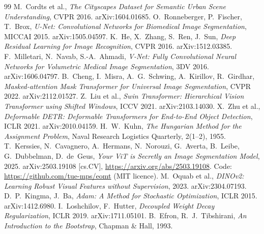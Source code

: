 \documentclass[11pt,a4paper]{article}
\newcommand{\1}{\mathbb{1}}
\begin{document}
\sloppy
\begin{thebibliography}{99}
 M.~Cordts et al., \emph{The Cityscapes Dataset for
  Semantic Urban Scene Understanding}, CVPR 2016. arXiv:1604.01685.
 O.~Ronneberger, P.~Fischer, T.~Brox,
  \emph{U-Net: Convolutional Networks for Biomedical Image Segmentation},
  MICCAI 2015. arXiv:1505.04597.
 K.~He, X.~Zhang, S.~Ren, J.~Sun, \emph{Deep Residual
  Learning for Image Recognition}, CVPR 2016. arXiv:1512.03385.
 F.~Milletari, N.~Navab, S.-A.~Ahmadi,
  \emph{V-Net: Fully Convolutional Neural Networks for Volumetric Medical
  Image Segmentation}, 3DV 2016. arXiv:1606.04797.
 B.~Cheng, I.~Misra, A.~G.~Schwing, A.~Kirillov,
  R.~Girdhar, \emph{Masked-attention Mask Transformer for Universal Image
  Segmentation}, CVPR 2022. arXiv:2112.01527.
 Z.~Liu et al., \emph{Swin Transformer: Hierarchical Vision
  Transformer using Shifted Windows}, ICCV 2021. arXiv:2103.14030.
 X.~Zhu et al., \emph{Deformable DETR: Deformable
  Transformers for End-to-End Object Detection}, ICLR 2021. arXiv:2010.04159.
 H.~W.~Kuhn, \emph{The Hungarian Method for the Assignment
  Problem}, Naval Research Logistics Quarterly, 2(1--2), 1955.
 T.~Kerssies, N.~Cavagnero,
  A.~Hermans, N.~Norouzi, G.~Averta, B.~Leibe, G.~Dubbelman, D.~de~Geus,
  \emph{Your ViT is Secretly an Image Segmentation Model}, 2025.
  arXiv:2503.19108 [cs.CV], \url{https://arxiv.org/abs/2503.19108}.
  Code: \url{https://github.com/tue-mps/eomt} (MIT licence).
 M.~Oquab et al., \emph{DINOv2: Learning Robust Visual
  Features without Supervision}, 2023. arXiv:2304.07193.
 D.~P.~Kingma, J.~Ba, \emph{Adam: A Method for
  Stochastic Optimization}, ICLR 2015. arXiv:1412.6980.
 I.~Loshchilov, F.~Hutter, \emph{Decoupled Weight
  Decay Regularization}, ICLR 2019. arXiv:1711.05101.
 B.~Efron, R.~J.~Tibshirani, \emph{An Introduction to the
  Bootstrap}, Chapman \& Hall, 1993.
\end{thebibliography}
\end{document}
